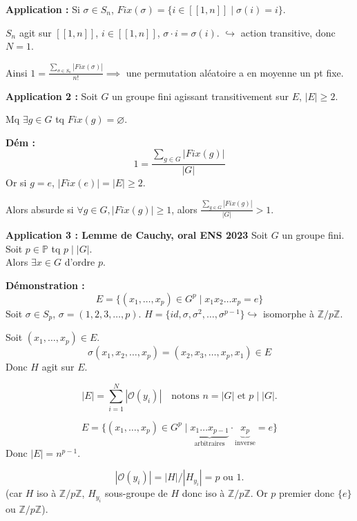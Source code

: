 \begin{exemple}
\textbf{Application :} Si $\sigma \in S_n$, $Fix(\sigma) = \{ i \in [\![ 1, n ]\!] \mid \sigma(i) = i \}$.

$S_n$ agit sur $[\![ 1, n ]\!]$, $i \in [\![ 1, n ]\!]$, $\sigma \cdot i = \sigma(i)$.
$\hookrightarrow$ action transitive, donc $N=1$.

Ainsi $1 = \frac{\sum_{\sigma \in S_n} |Fix(\sigma)|}{n!} \implies$ une permutation aléatoire a en moyenne un pt fixe.
\end{exemple}

\begin{exemple}
\textbf{Application 2 :} Soit $G$ un groupe fini agissant transitivement sur $E$, $|E| \geqslant 2$.

Mq $\exists g \in G$ tq $Fix(g) = \varnothing$.
\end{exemple}

\noindent \textbf{Dém :}
\[ 1 = \frac{\sum_{g \in G} |Fix(g)|}{|G|} \]
Or si $g=e$, $|Fix(e)| = |E| \geqslant 2$.

Alors absurde si $\forall g \in G, |Fix(g)| \geqslant 1$, alors $\frac{\sum_{g \in G} |Fix(g)|}{|G|} > 1$.

\vspace{0.5cm}

\begin{exemple}
    \textbf{Application 3 : Lemme de Cauchy, oral ENS 2023}
Soit $G$ un groupe fini. Soit $p \in \mathbb{P}$ tq $p \mid |G|$.\\
Alors $\exists x \in G$ d'ordre $p$.
\end{exemple}

\noindent \textbf{Démonstration :}
\[ E = \{ (x_1, \dots, x_p) \in G^p \mid x_1 x_2 \dots x_p = e \} \]
Soit $\sigma \in S_p$, $\sigma = (1, 2, 3, \dots, p)$. $H = \{ id, \sigma, \sigma^2, \dots, \sigma^{p-1} \} \hookrightarrow$ isomorphe à $\mathbb{Z}/p\mathbb{Z}$.

Soit $(x_1, \dots, x_p) \in E$.
\[ \sigma(x_1, x_2, \dots, x_p) = (x_2, x_3, \dots, x_p, x_1) \in E \]
Donc $H$ agit sur $E$.

\[ |E| = \sum_{i=1}^N |\mathcal{O}(y_i)| \quad \text{notons } n = |G| \text{ et } p \mid |G|. \]

\[ E = \{ (x_1, \dots, x_p) \in G^p \mid \underbrace{x_1 \dots x_{p-1}}_{\text{arbitraires}} \cdot \underbrace{x_p}_{\text{inverse}} = e \} \]
Donc $|E| = n^{p-1}$.

\[ |\mathcal{O}(y_i)| = |H|/|H_{y_i}| = p \text{ ou } 1. \]
(car $H$ iso à $\mathbb{Z}/p\mathbb{Z}$, $H_{y_i}$ sous-groupe de $H$ donc iso à $\mathbb{Z}/p\mathbb{Z}$. Or $p$ premier donc $\{e\}$ ou $\mathbb{Z}/p\mathbb{Z}$).


